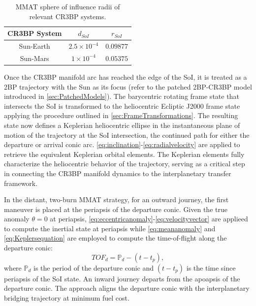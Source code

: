 \begin{table}[H]
    \centering
    \caption{MMAT sphere of influence radii of relevant CR3BP systems.}
    \begin{tabular}{|c|c|c|}
        \hline
        \textbf{CR3BP System}   &   \boldmath$d_{SoI}$  &   \boldmath$r_{SoI}$  \\  \hline
        Sun-Earth               &   $2.5\times10^{-4}$  &   $0.09877$           \\  \hline
        Sun-Mars                &   $1\times10^{-4}$    &   $0.05375$           \\  \hline
    \end{tabular}
    \label{tab:SoI}
\end{table}

Once the CR3BP manifold arc has reached the edge of the SoI, it is treated as a 2BP trajectory with
the Sun as its focus (refer to the patched 2BP-CR3BP model introduced in \cref{sec:PatchedModels}).
The barycentric rotating frame state that intersects the SoI is transformed to the heliocentric
Ecliptic J2000 frame state applying the procedure outlined in \cref{sec:FrameTransformations}. The
resulting state now defines a Keplerian heliocentric ellipse in the instantaneous plane of motion
of the trajectory at the SoI intersection, the continued path for either the departure or arrival
conic arc. \cref{eq:inclination}-\cref{eq:radialvelocity} are applied to retrieve the equivalent
Keplerian orbital elements. The Keplerian elements fully characterize the heliocentric behavior of
the trajectory, serving as a critical step in connecting the CR3BP manifold dynamics to the
interplanetary transfer framework.

In the distant, two-burn MMAT strategy, for an outward journey, the first maneuver is placed at
the periapsis of the departure conic. Given the true anomaly $\theta=0$ at periapsis,
\cref{eq:eccentricanomaly}-\cref{eq:velocityvector} are applieed to compute the inertial state at
periapsis while \cref{eq:meananomaly} and \cref{eq:Keplersequation} are employed to compute the
time-of-flight along the departure conic:
\begin{equation}
    TOF_{d}=\mathbb{P}_{d}-(t-t_{p}),
    \label{eq:departureTOF}
\end{equation}
where $\mathbb{P}_{d}$ is the period of the departure conic and $(t-t_{p})$ is the time since
periapsis of the SoI state. An inward journey departs from the apoapsis of the departure conic.
The approach aligns the departure conic with the interplanetary bridging trajectory at minimum fuel
cost.

